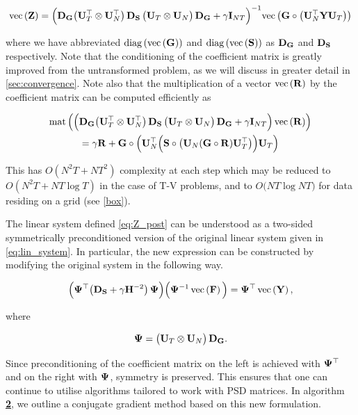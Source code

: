 \begin{equation}
    \label{eq:Z_post}
    \text{\textup{vec}}\left(\mathbf{Z}\right) = \Big( \mathbf{D}_{\mathbf{G}} \big( \mathbf{U}_T^\top \otimes \mathbf{U}_N^\top \big)\, \mathbf{D}_{\mathbf{S}} \, \big(\mathbf{U}_T \otimes \mathbf{U}_N \big) \,\mathbf{D}_{\mathbf{G}} + \gamma \mathbf{I}_{NT} \Big)^{-1} \text{\textup{vec}}\left(\mathbf{G} \circ \big(\mathbf{U}_N^\top \mathbf{Y} \mathbf{U}_T\big)\right)
\end{equation}

\noindent where we have abbreviated $\text{\textup{diag}}\left(\text{\textup{vec}}\left(\mathbf{G}\right)\right)$ and $\text{\textup{diag}}\left(\text{\textup{vec}}\left(\mathbf{S}\right)\right)$ as $\mathbf{D}_{\mathbf{G}}$ and $\mathbf{D}_{\mathbf{S}}$ respectively. Note that the conditioning of the coefficient matrix is greatly improved from the untransformed problem, as we will discuss in greater detail in \cref{sec:convergence}. Note also that the multiplication of a vector $\text{\textup{vec}}\left(\mathbf{R}\right)$ by the coefficient matrix can be computed efficiently as 

\begin{multline}
    \text{\textup{mat}}\left(\Big( \mathbf{D}_{\mathbf{G}} \big( \mathbf{U}_T^\top \otimes \mathbf{U}_N^\top \big)\, \mathbf{D}_{\mathbf{S}} \, \big(\mathbf{U}_T \otimes \mathbf{U}_N \big) \,\mathbf{D}_{\mathbf{G}} + \gamma \mathbf{I}_{NT} \Big) \, \text{\textup{vec}}\left(\mathbf{R}\right)\right) \\ = \gamma \mathbf{R} + \mathbf{G} \circ \left(\mathbf{U}_N^\top \Big( \mathbf{S} \circ \big(\mathbf{U}_N (\mathbf{G} \circ \mathbf{R}) \mathbf{U}_T^\top \big) \Big) \mathbf{U}_T\right) 
\end{multline}



This has $O(N^2T + NT^2)$ complexity at each step which may be reduced to $O(N^2T + NT \log T)$ in the case of T-V problems, and to $O\big(NT \log NT \big)$ for data residing on a grid (see \cref{box}). 

The linear system defined \cref{eq:Z_post} can be understood as a two-sided symmetrically preconditioned version of the original linear system given in \cref{eq:lin_system}. In particular, the new expression can be constructed by modifying the original system in the following way.

\begin{equation}
    \Big(\mathbf{\Psi}^\top  \big(\mathbf{D}_{\mathbf{S}} + \gamma  \mathbf{H}^{-2}\big) \, \mathbf{\Psi}  \Big) \Big(\mathbf{\Psi}^{-1}\, \text{\textup{vec}}\left( \mathbf{F} \right) \Big) = \mathbf{\Psi}^\top \, \text{\textup{vec}}\left(\mathbf{Y}\right),
\end{equation}

\noindent where

\begin{equation}
    \mathbf{\Psi} =   \big(\mathbf{U}_T \otimes \mathbf{U}_N\big) \, \mathbf{D}_{\mathbf{G}}.
\end{equation}

Since preconditioning of the coefficient matrix on the left is achieved with $\mathbf{\Psi}^\top$ and on the right with $\mathbf{\Psi}$, symmetry is preserved. This ensures that one can continue to utilise algorithms tailored to work with PSD matrices. In algorithm \hyperlink{al:CGM}{\textbf{2}}, we outline a conjugate gradient method based on this new formulation. 

